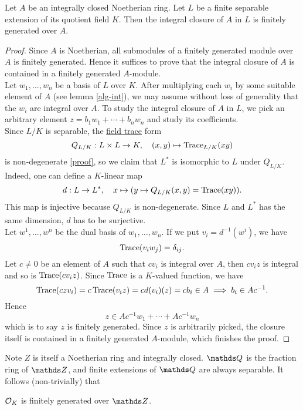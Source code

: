 			\begin{theorem}\label{closure-f-g}
				Let $A$ be an integrally closed Noetherian ring. Let $L$ be a finite separable extension of its quotient field $K$. Then the integral closure of $A$ in $L$ is finitely generated over $A$.
			\end{theorem}
			\begin{proof}
				Since $A$ is Noetherian, all submodules of a finitely generated module over $A$ is finitely generated. Hence it suffices to prove that the integral closure of $A$ is contained in a finitely generated $A$-module.\\
				Let $w_1,\dots,w_n$ be a basis of $L$ over $K$. After multiplying each $w_i$ by some suitable element of $A$ (see lemma \ref{alg-int}), we may assume without loss of generality that the $w_i$ are integral over $A$. To study the integral closure of $A$ in $L$, we pick an arbitrary element $z = b_1w_1+\cdots+b_nw_n$ and study its coefficients. \\
				Since $L/K$ is separable, the \href{https://stacks.math.columbia.edu/tag/0BIF}{field trace} form
				\[
					Q_{L/K}:L \times L \to K, \quad (x,y) \mapsto \operatorname{Trace}_{L/K}(xy)
				\]
				is non-degenerate  \href{https://stacks.math.columbia.edu/tag/0BIL}{[proof]}, so we claim that $L^\ast$ is isomorphic to $L$ under $Q_{L/K}$. Indeed, one can define a $K$-linear map
				\[
					d:L \to L^\ast, \quad x \mapsto (y \mapsto Q_{L/K}(x,y)=\operatorname{Trace}(xy)).
				\]
				This map is injective because $Q_{L/K}$ is non-degenerate. Since $L$ and $L^\ast$ has the same dimension, $d$ has to be surjective.\\
				Let $w^1,\dots,w^n$ be the dual basis of $w_1,\dots,w_n$. If we put $v_i=d^{-1}(w^i)$, we have
				\[
					\operatorname{Trace}(v_i w_j) = \delta_{ij}.
				\]
				Let $c \ne 0$ be an element of $A$ such that $cv_i$ is integral over $A$, then $cv_iz$ is integral and so is $\operatorname{Trace}(cv_iz)$. Since $\operatorname{Trace}$ is a $K$-valued function, we have
				\[
					\operatorname{Trace}(czv_i)=c\operatorname{Trace}(v_iz)=c d(v_i)(z) = cb_i \in A \implies b_i \in Ac^{-1}.
				\]
				Hence
				\[
					z \in Ac^{-1}w_1+\cdots+Ac^{-1}w_n
				\]
				which is to say $z$ is finitely generated. Since $z$ is arbitrarily picked, the closure itself is contained in a finitely generated $A$-module, which finishes the proof. 
			\end{proof}
			Note $Z$ is itself a Noetherian ring and integrally closed. $\Q$ is the fraction ring of $\Z$, and finite extensions of $\Q$ are always separable. It follows (non-trivially) that
			\begin{corollary}
				$\mathcal{O}_K$ is finitely generated over $\Z$.
			\end{corollary}
			
